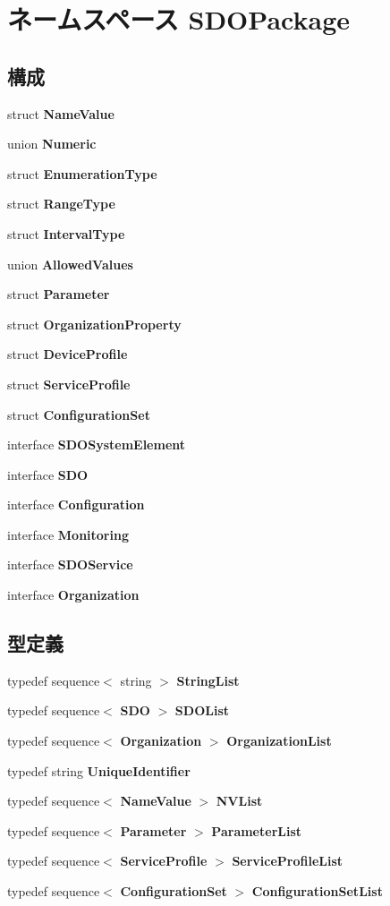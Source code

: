 \section{ネームスペース SDOPackage}
\label{namespaceSDOPackage}
\subsection*{構成}
\begin{DoxyCompactItemize}
\item 
struct {\bf NameValue}
\item 
union {\bf Numeric}
\item 
struct {\bf EnumerationType}
\item 
struct {\bf RangeType}
\item 
struct {\bf IntervalType}
\item 
union {\bf AllowedValues}
\item 
struct {\bf Parameter}
\item 
struct {\bf OrganizationProperty}
\item 
struct {\bf DeviceProfile}
\item 
struct {\bf ServiceProfile}
\item 
struct {\bf ConfigurationSet}
\item 
interface {\bf SDOSystemElement}
\item 
interface {\bf SDO}
\item 
interface {\bf Configuration}
\item 
interface {\bf Monitoring}
\item 
interface {\bf SDOService}
\item 
interface {\bf Organization}
\end{DoxyCompactItemize}
\subsection*{型定義}
\begin{DoxyCompactItemize}
\item 
typedef sequence$<$ string $>$ {\bf StringList}
\item 
typedef sequence$<$ {\bf SDO} $>$ {\bf SDOList}
\item 
typedef sequence$<$ {\bf Organization} $>$ {\bf OrganizationList}
\item 
typedef string {\bf UniqueIdentifier}
\item 
typedef sequence$<$ {\bf NameValue} $>$ {\bf NVList}
\item 
typedef sequence$<$ {\bf Parameter} $>$ {\bf ParameterList}
\item 
typedef sequence$<$ {\bf ServiceProfile} $>$ {\bf ServiceProfileList}
\item 
typedef sequence$<$ {\bf ConfigurationSet} $>$ {\bf ConfigurationSetList}
\end{DoxyCompactItemize}
